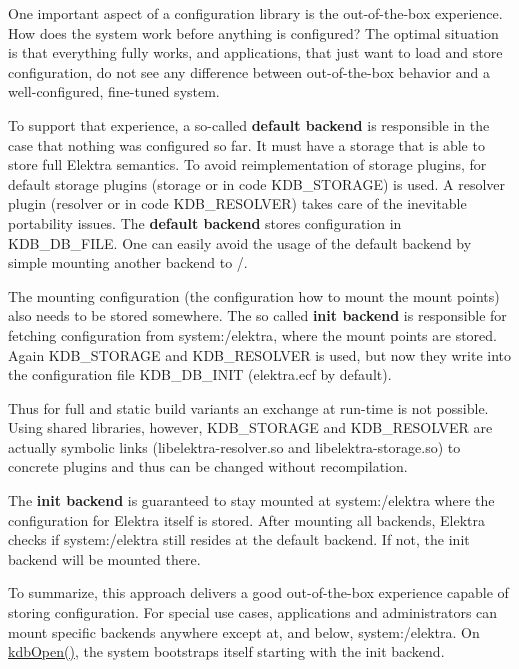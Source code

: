 One important aspect of a configuration library is the out-\/of-\/the-\/box experience. How does the system work before anything is configured? The optimal situation is that everything fully works, and applications, that just want to load and store configuration, do not see any difference between out-\/of-\/the-\/box behavior and a well-\/configured, fine-\/tuned system.

To support that experience, a so-\/called {\bfseries default backend} is responsible in the case that nothing was configured so far. It must have a storage that is able to store full Elektra semantics. To avoid reimplementation of storage plugins, for default storage plugins ({\ttfamily storage} or in code {\ttfamily K\+D\+B\+\_\+\+S\+T\+O\+R\+A\+GE}) is used. A resolver plugin ({\ttfamily resolver} or in code {\ttfamily K\+D\+B\+\_\+\+R\+E\+S\+O\+L\+V\+ER}) takes care of the inevitable portability issues. The {\bfseries default backend} stores configuration in {\ttfamily K\+D\+B\+\_\+\+D\+B\+\_\+\+F\+I\+LE}. One can easily avoid the usage of the default backend by simple mounting another backend to {\ttfamily /}.

The mounting configuration (the configuration how to mount the mount points) also needs to be stored somewhere. The so called {\bfseries init backend} is responsible for fetching configuration from {\ttfamily system\+:/elektra}, where the mount points are stored. Again {\ttfamily K\+D\+B\+\_\+\+S\+T\+O\+R\+A\+GE} and {\ttfamily K\+D\+B\+\_\+\+R\+E\+S\+O\+L\+V\+ER} is used, but now they write into the configuration file {\ttfamily K\+D\+B\+\_\+\+D\+B\+\_\+\+I\+N\+IT} ({\ttfamily elektra.\+ecf} by default).

Thus for full and static build variants an exchange at run-\/time is not possible. Using shared libraries, however, {\ttfamily K\+D\+B\+\_\+\+S\+T\+O\+R\+A\+GE} and {\ttfamily K\+D\+B\+\_\+\+R\+E\+S\+O\+L\+V\+ER} are actually symbolic links ({\ttfamily libelektra-\/resolver.\+so} and {\ttfamily libelektra-\/storage.\+so}) to concrete plugins and thus can be changed without recompilation.

The {\bfseries init backend} is guaranteed to stay mounted at {\ttfamily system\+:/elektra} where the configuration for Elektra itself is stored. After mounting all backends, Elektra checks if {\ttfamily system\+:/elektra} still resides at the default backend. If not, the init backend will be mounted there.

To summarize, this approach delivers a good out-\/of-\/the-\/box experience capable of storing configuration. For special use cases, applications and administrators can mount specific backends anywhere except at, and below, {\ttfamily system\+:/elektra}. On {\ttfamily \hyperlink{group__kdb_ga6808defe5870f328dd17910aacbdc6ca}{kdb\+Open()}}, the system bootstraps itself starting with the init backend.

